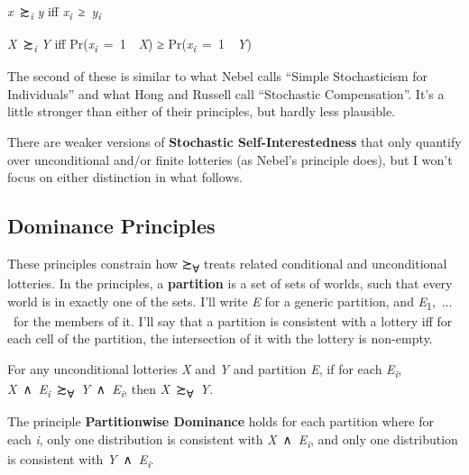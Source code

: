 \documentclass[
  11pt,
  letterpaper,
  DIV=11,
  numbers=noendperiod,
  twoside]{scrartcl}
\providecommand{\tightlist}{%
  \setlength{\itemsep}{0pt}\setlength{\parskip}{0pt}}
\begin{document}
\begin{description}
\tightlist
\item[Self-Interestedness]
\emph{x}~≿\textsubscript{\emph{i}} \emph{y} iff
\emph{x\textsubscript{i}}~≥~\emph{y\textsubscript{i}}
\item[Stochastic Self-Interestedness]
\emph{X}~≿\textsubscript{\emph{i}} \emph{Y} iff
Pr(\emph{x\textsubscript{i}}~=~1~\textbar~\emph{X}) ≥
Pr(\emph{x\textsubscript{i}}~=~1~\textbar~\emph{Y})
\end{description}

The second of these is similar to what Nebel calls ``Simple
Stochasticism for Individuals'' and what Hong and Russell call
``Stochastic Compensation''. It's a little stronger than either of their
principles, but hardly less plausible.

There are weaker versions of \textbf{Stochastic Self-Interestedness}
that only quantify over unconditional and/or finite lotteries (as
Nebel's principle does), but I won't focus on either distinction in what
follows.

\subsection{Dominance Principles}\label{dominance-principles}

These principles constrain how ≿\textsubscript{∀} treats related
conditional and unconditional lotteries. In the principles, a
\textbf{partition} is a set of sets of worlds, such that every world is
in exactly one of the sets. I'll write \emph{E} for a generic partition,
and \emph{E}\textsubscript{1},~\(\ldots\)~for the members of it. I'll
say that a partition is consistent with a lottery iff for each cell of
the partition, the intersection of it with the lottery is non-empty.

\begin{description}
\tightlist
\item[Partitionwise Dominance]
For any unconditional lotteries \emph{X} and \emph{Y} and partition
\emph{E}, if for each \emph{E\textsubscript{i}},
\emph{X}~∧~\emph{E\textsubscript{i}}~≿\textsubscript{∀}~\emph{Y}~∧~\emph{E\textsubscript{i}},
then \emph{X}~≿\textsubscript{∀}~\emph{Y}.
\item[Statewise Dominance]
The principle \textbf{Partitionwise Dominance} holds for each partition
where for each \emph{i}, only one distribution is consistent with
\emph{X}~∧~\emph{E\textsubscript{i}}, and only one distribution is
consistent with \emph{Y}~∧~\emph{E\textsubscript{i}}.
\end{description}
\end{document}
